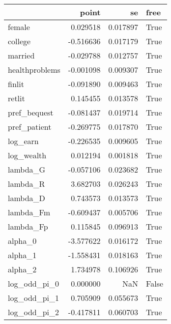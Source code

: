\begin{tabular}{lrrl}
\toprule
{} &     point &        se &   free \\
\midrule
female         &  0.029518 &  0.017897 &   True \\
college        & -0.516636 &  0.017179 &   True \\
married        & -0.029788 &  0.012757 &   True \\
healthproblems & -0.001098 &  0.009307 &   True \\
finlit         & -0.091890 &  0.009463 &   True \\
retlit         &  0.145455 &  0.013578 &   True \\
pref\_bequest   & -0.081437 &  0.019714 &   True \\
pref\_patient   & -0.269775 &  0.017870 &   True \\
log\_earn       & -0.226535 &  0.009605 &   True \\
log\_wealth     &  0.012194 &  0.001818 &   True \\
lambda\_G       & -0.057106 &  0.023682 &   True \\
lambda\_R       &  3.682703 &  0.026243 &   True \\
lambda\_D       &  0.743573 &  0.013573 &   True \\
lambda\_Fm      & -0.609437 &  0.005706 &   True \\
lambda\_Fp      &  0.115845 &  0.096913 &   True \\
alpha\_0        & -3.577622 &  0.016172 &   True \\
alpha\_1        & -1.558431 &  0.018163 &   True \\
alpha\_2        &  1.734978 &  0.106926 &   True \\
log\_odd\_pi\_0   &  0.000000 &       NaN &  False \\
log\_odd\_pi\_1   &  0.705909 &  0.055673 &   True \\
log\_odd\_pi\_2   & -0.417811 &  0.060703 &   True \\
\bottomrule
\end{tabular}
